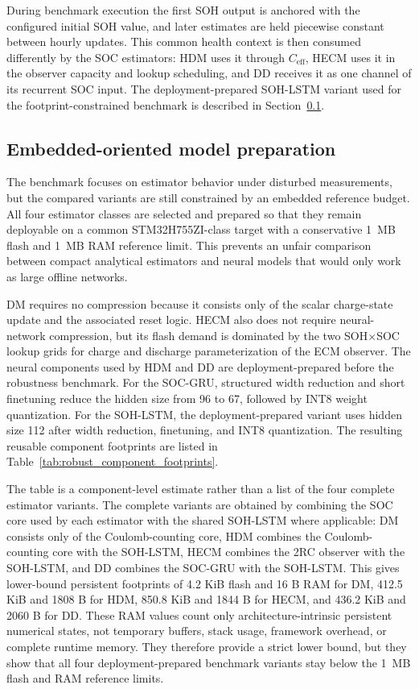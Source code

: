 \documentclass[
    a4paper,
    12pt,
    titlepage,
    bibliography=totoc,
    twoside=on,
    parskip=false,
    numbers=noenddot,
    cleardoublepage=empty,
    DIV=12,
    BCOR=12.0mm,
    headheight=36pt,
    headings=openright
]{scrreprt}
\begin{document}
During benchmark execution the first SOH output is anchored with the configured initial SOH value, and later estimates are held piecewise constant between hourly updates. This common health context is then consumed differently by the SOC estimators: HDM uses it through $C_{\mathrm{eff}}$, HECM uses it in the observer capacity and lookup scheduling, and DD receives it as one channel of its recurrent SOC input. The deployment-prepared SOH-LSTM variant used for the footprint-constrained benchmark is described in Section~\ref{sec:robustness_embedded_preparation}.

\subsection{Embedded-oriented model preparation}
\label{sec:robustness_embedded_preparation}
The benchmark focuses on estimator behavior under disturbed measurements, but the compared variants are still constrained by an embedded reference budget. All four estimator classes are selected and prepared so that they remain deployable on a common STM32H755ZI-class target with a conservative \SI{1}{MB} flash and \SI{1}{MB} RAM reference limit. This prevents an unfair comparison between compact analytical estimators and neural models that would only work as large offline networks.

DM requires no compression because it consists only of the scalar charge-state update and the associated reset logic. HECM also does not require neural-network compression, but its flash demand is dominated by the two SOH$\times$SOC lookup grids for charge and discharge parameterization of the ECM observer. The neural components used by HDM and DD are deployment-prepared before the robustness benchmark. For the SOC-GRU, structured width reduction and short finetuning reduce the hidden size from 96 to 67, followed by INT8 weight quantization. For the SOH-LSTM, the deployment-prepared variant uses hidden size 112 after width reduction, finetuning, and INT8 quantization. The resulting reusable component footprints are listed in Table~\ref{tab:robust_component_footprints}.

The table is a component-level estimate rather than a list of the four complete estimator variants. The complete variants are obtained by combining the SOC core used by each estimator with the shared SOH-LSTM where applicable: DM consists only of the Coulomb-counting core, HDM combines the Coulomb-counting core with the SOH-LSTM, HECM combines the 2RC observer with the SOH-LSTM, and DD combines the SOC-GRU with the SOH-LSTM. This gives lower-bound persistent footprints of 4.2 KiB flash and 16 B RAM for DM, 412.5 KiB and 1808 B for HDM, 850.8 KiB and 1844 B for HECM, and 436.2 KiB and 2060 B for DD. These RAM values count only architecture-intrinsic persistent numerical states, not temporary buffers, stack usage, framework overhead, or complete runtime memory. They therefore provide a strict lower bound, but they show that all four deployment-prepared benchmark variants stay below the \SI{1}{MB} flash and RAM reference limits.
\end{document}
